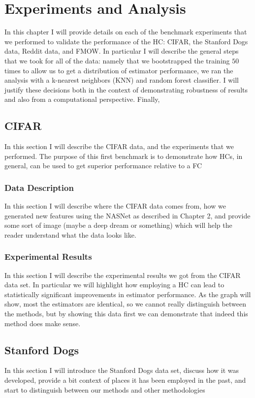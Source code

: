 \documentclass[../thesis.tex]{subfiles}
\begin{document}
\chapter{Experiments and Analysis}
In this chapter I will provide details on each of the benchmark experiments that we performed to validate the performance of the HC: CIFAR, the Stanford Dogs data, Reddit data, and FMOW. In particular I will describe the general steps that we took for all of the data: namely that we bootstrapped the training $50$ times to allow us to get a distribution of estimator performance, we ran the analysis with a k-nearest neighbors (KNN) and random forest classifier. I will justify these decisions both in the context of demonstrating robustness of results and also from a computational perspective. Finally, 

\section{CIFAR}
In this section I will describe the CIFAR data, and the experiments that we performed. The purpose of this first benchmark is to demonstrate how HCs, in general, can be used to get superior performance relative to a FC

\subsection{Data Description}
In this section I will describe where the CIFAR data comes from, how we generated new features using the NASNet as described in Chapter 2, and provide some sort of image (maybe a deep dream or something) which will help the reader understand what the data looks like.

\subsection{Experimental Results}
In this section I will describe the experimental results we got from the CIFAR data set. In particular we will highlight how employing a HC can lead to statistically significant improvements in estimator performance. As the graph will show, most the estimators are identical, so we cannot really distinguish between the methods, but by showing this data first we can demonstrate that indeed this method does make sense.

\section{Stanford Dogs}
In this section I will introduce the Stanford Dogs data set, discuss how it was developed, provide a bit context of places it has been employed in the past, and start to distinguish between our methods and other methodologies
\end{document}
